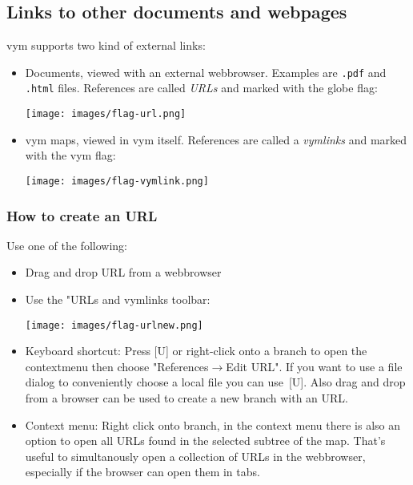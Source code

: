 \documentclass[12pt,a4paper]{article}
\newcommand{\vym}{{\sc vym }}
\newcommand{\ra}{$\longrightarrow$}
\newcommand{\key}[1]{[#1]}
\begin{document}
\subsection{Links to other documents and webpages}
\vym supports two kind of external links:
\begin{itemize}
    \item Documents, viewed with an external webbrowser.
    Examples are {\tt .pdf} and {\tt .html} files. References 
    are called {\em URLs} and marked with the globe
    flag:
    \begin{center}
	\texttt{[image: images/flag-url.png]}
    \end{center}

    \item \vym maps, viewed in \vym itself. References are called
    a {\em vymlinks} and marked with the \vym flag:
    \begin{center}
	\texttt{[image: images/flag-vymlink.png]}
    \end{center}
\end{itemize}

\subsubsection{How to create an URL} 
Use one of the following:
\begin{itemize}
\item{Drag and drop URL from a webbrowser}
\item{Use the "URLs and vymlinks toolbar:}
    \begin{center}
	\texttt{[image: images/flag-urlnew.png]}
    \end{center}
\item{Keyboard shortcut:}
    Press \key{U} or right-click  onto a
    branch to open the contextmenu then choose "References\ra Edit URL". If
    you want to use a file dialog to conveniently choose a local file you
    can use~\key{U}. Also drag and drop from a browser can be used to create
    a new branch with an URL.
\item{Context menu:} 
    Right click onto branch,
    in the context menu there is also an option to open all URLs found
    in the selected subtree of the map. That's useful to simultanously open
    a collection of URLs in the webbrowser, especially if the browser can
    open them in tabs.

\end{itemize}
\end{document}
